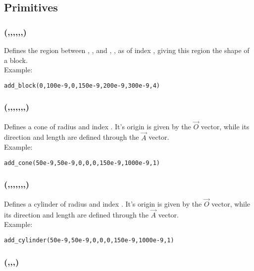 \subsection{Primitives}

\subsubsection[add\_block]{(,,,,,,)}

Defines the region between , ,  and , ,  as of index , giving this region the shape of a block.\\ Example:
\begin{lstlisting}
add_block(0,100e-9,0,150e-9,200e-9,300e-9,4)
\end{lstlisting}

\subsubsection[add\_cone]{(,,,,,,,)}

Defines a cone of radius  and index . It's origin is given by the $\vec O$ vector, while its direction and length are defined through the $\vec A$ vector.\\ Example:

\begin{lstlisting}
add_cone(50e-9,50e-9,0,0,0,150e-9,1000e-9,1)
\end{lstlisting}

\subsubsection[add\_cylinder]{(,,,,,,,)}

Defines a cylinder of radius  and index . It's origin is given by the $\vec O$ vector, while its direction and length are defined through the $\vec A$ vector.\\ Example:
\begin{lstlisting}
add_cylinder(50e-9,50e-9,0,0,0,150e-9,1000e-9,1)
\end{lstlisting}

\subsubsection[add\_layer]{(,,,)}

